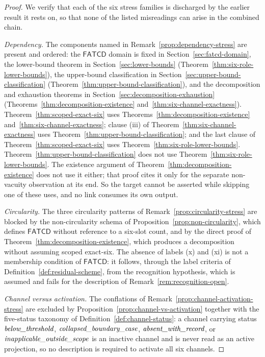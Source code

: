 \documentclass[11pt]{article}
\theoremstyle{definition}
\newcommand{\FATCD}{\ensuremath{\mathsf{FATCD}}}
\newcommand{\belowthr}{\textit{below\_\allowbreak threshold}}
\newcommand{\collapsedbc}{\textit{collapsed\_\allowbreak boundary\_\allowbreak case}}
\newcommand{\absentrec}{\textit{absent\_\allowbreak with\_\allowbreak record}}
\newcommand{\outsidescope}{\textit{inapplicable\_\allowbreak outside\_\allowbreak scope}}
\begin{document}
\begin{proof}
We verify that each of the six stress families is discharged by the earlier
result it rests on, so that none of the listed misreadings can arise in
the combined chain.

\emph{Dependency.} The components named in
Remark~\ref{prop:dependency-stress} are present and ordered: the
\FATCD{} domain is fixed in Section~\ref{sec:fatcd-domain}, the
lower-bound theorem in Section~\ref{sec:lower-bounds}
(Theorem~\ref{thm:six-role-lower-bounds}), the upper-bound
classification in Section~\ref{sec:upper-bound-classification}
(Theorem~\ref{thm:upper-bound-classification}), and the
decomposition and exhaustion theorems in
Section~\ref{sec:decomposition-exhaustion}
(Theorems~\ref{thm:decomposition-existence}
and~\ref{thm:six-channel-exactness}). Theorem~\ref{thm:scoped-exact-six}
uses Theorems~\ref{thm:decomposition-existence}
and~\ref{thm:six-channel-exactness}; clause (iii) of
Theorem~\ref{thm:six-channel-exactness} uses
Theorem~\ref{thm:upper-bound-classification}; and the last clause of
Theorem~\ref{thm:scoped-exact-six} uses
Theorem~\ref{thm:six-role-lower-bounds}. Theorem~\ref{thm:upper-bound-classification} does not use
Theorem~\ref{thm:six-role-lower-bounds}. The existence argument of
Theorem~\ref{thm:decomposition-existence} does not use it either; that proof
cites it only for the separate non-vacuity observation at its end. So the target cannot be asserted
while skipping one of these uses, and no link consumes its own output.

\emph{Circularity.} The three circularity patterns of
Remark~\ref{prop:circularity-stress} are blocked by the
non-circularity schema of Proposition~\ref{prop:non-circularity}, which
defines \FATCD{} without reference to a six-slot count, and by the
direct proof of Theorem~\ref{thm:decomposition-existence}, which
produces a decomposition without assuming scoped exact-six. The absence of
labels (x) and (xi) is not a membership condition of \FATCD{}: it follows,
through the label criteria of Definition~\ref{def:residual-scheme}, from the
recognition hypothesis, which is assumed and fails for the description of
Remark~\ref{rem:recognition-open}.

\emph{Channel versus activation.} The conflations of
Remark~\ref{prop:channel-activation-stress} are excluded by
Proposition~\ref{prop:channel-vs-activation} together with the
five-status taxonomy of Definition~\ref{def:channel-status}: a channel
carrying status \(\belowthr\), \(\collapsedbc\), \(\absentrec\), or
\(\outsidescope\) is an inactive channel and is never read as an active
projection, so no description is required to activate all six channels.


\end{proof}
\end{document}
